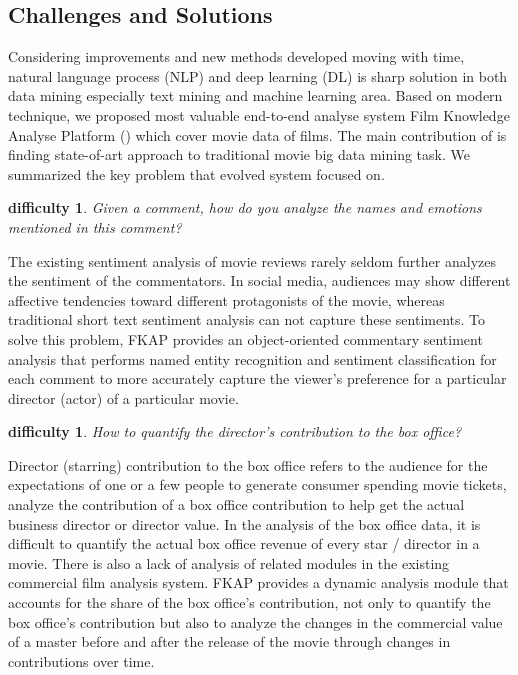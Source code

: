 \subsection{Challenges and Solutions}
Considering improvements and new methods developed moving with time, natural language process (NLP) and deep learning (DL) is sharp solution in both data mining especially text mining and machine learning area. Based on modern technique, we proposed most valuable end-to-end analyse system Film Knowledge Analyse Platform (\system) which cover movie data of films. The main contribution of \system is finding state-of-art approach to traditional movie big data mining task. We summarized the key problem that evolved system \system focused on.
\newtheorem{difficulties}[theorem]{difficulty}
\begin{difficulties}
Given a comment, how do you analyze the names and emotions mentioned in this comment? \end{difficulties}
\par The existing sentiment analysis of movie reviews rarely seldom further analyzes the sentiment of the commentators. In social media, audiences may show different affective tendencies toward different protagonists of the movie, whereas traditional short text sentiment analysis can not capture these sentiments. To solve this problem, FKAP provides an object-oriented commentary sentiment analysis that performs named entity recognition and sentiment classification for each comment to more accurately capture the viewer's preference for a particular director (actor) of a particular movie.
\begin{difficulties}
How to quantify the director's contribution to the box office?
\end{difficulties}
\par Director (starring) contribution to the box office refers to the audience for the expectations of one or a few people to generate consumer spending movie tickets, analyze the contribution of a box office contribution to help get the actual business director or director value. In the analysis of the box office data, it is difficult to quantify the actual box office revenue of every star / director in a movie. There is also a lack of analysis of related modules in the existing commercial film analysis system.
FKAP provides a dynamic analysis module that accounts for the share of the box office's contribution, not only to quantify the box office's contribution but also to analyze the changes in the commercial value of a master before and after the release of the movie through changes in contributions over time.
